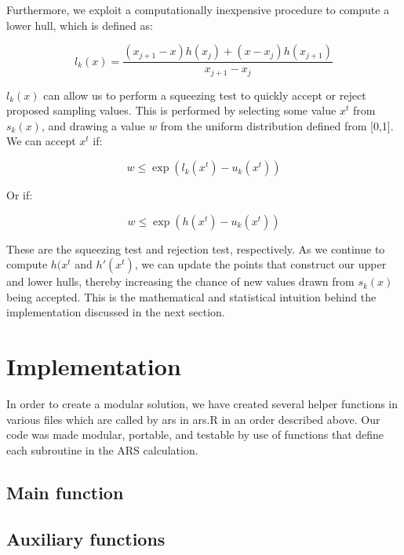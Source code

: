 \documentclass[12pt, oneside]{article}
\begin{document}
Furthermore, we exploit a computationally inexpensive procedure to compute a lower hull, which is defined as:

\[ l_k(x) = \frac{(x_{j+1} - x)h(x_j) + (x - x_j) h(x_{j+1})}{x_{j+1} - x_{j}} \]

\(l_k(x) \) can allow us to perform a squeezing test to quickly accept or reject proposed sampling values.  This is performed by selecting some value \(x^t\) from \(s_k(x)\), and drawing a value \(w\) from the uniform distribution defined from [0,1].  We can accept \(x^t\) if:

\[ w \le \exp(l_k(x^t) - u_k(x^t)) \]

Or if:

\[ w \le \exp(h(x^t) - u_k(x^t)) \]

These are the squeezing test and rejection test, respectively.  As we continue to compute \(h(x^t\) and \(h'(x^t)\), we can update the points that construct our upper and lower hulls, thereby increasing the chance of new values drawn from \(s_k(x)\) being accepted.  This is the mathematical and statistical intuition behind the implementation discussed in the next section.

\section{Implementation}

In order to create a modular solution, we have created several helper functions in various files which are called by ars in ars.R in an order described above.  Our code was made modular, portable, and testable by use of functions that define each subroutine in the ARS calculation.

\subsection{Main function}




\subsection{Auxiliary functions}
\end{document}
